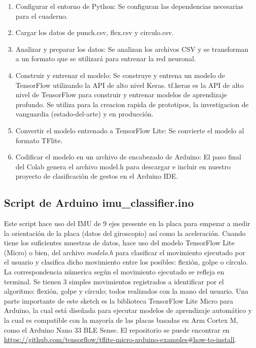     \begin{enumerate}
        \item Configurar el entorno de Python: Se configuran las dependencias necesarias para el cuaderno. \cite{arduino}
        \item Cargar los datos de punch.csv, flex.csv y circulo.csv.
        \item Analizar y preparar los datos: Se analizan los archivos CSV y se transforman a un formato que se utilizará para entrenar la red neuronal. \cite{arduino}
        \item Construir y entrenar el modelo: Se construye y entrena un modelo de TensorFlow utilizando la API de alto nivel Keras. \cite{arduino} tf.keras es la API de alto nivel de TensorFlow para construir y entrenar modelos de aprendizaje profundo. Se utiliza para la creacion rapida de prototipos, la investigacion de vanguardia (estado-del-arte) y en producción. \cite{keras}
        \item Convertir el modelo entrenado a TensorFlow Lite: Se convierte el modelo al formato TFlite. \cite{arduino}
        \item Codificar el modelo en un archivo de encabezado de Arduino: El paso final del Colab genera el archivo model.h para descargar e incluir en nuestro proyecto de clasificación de gestos en el Arduino IDE. \cite{arduino}
    \end{enumerate}

    \subsection{Script de Arduino imu\_classifier.ino }

    Este script hace uso del IMU de 9 ejes presente en la placa para empezar a medir la orientación de la placa (datos del giroscopio) así como la aceleración. Cuando tiene los suficientes muestras de datos, hace uso del modelo TensorFlow Lite (Micro) o bien, del archivo \textit{modelo.h} para clasificar el movimiento ejecutado por el usuario y clasifica dicho movimiento entre los posibles: flexión, golpe o círculo. La correspondencia númerica según el movimiento ejecutado se refleja en terminal.
    Se tienen 3 simples movimientos registrados a identificar por el algoritmo: flexión, golpe y círculo; todos realizados con la mano del usuario. Una parte importante de este sketch es la biblioteca TensorFlow Lite Micro para Arduino, la cual está diseñada para ejecutar modelos de aprendizaje automático y la cual es compatible con la mayoría de las placas basadas en Arm Cortex M, como el Arduino Nano 33 BLE Sense. El repositorio se puede encontrar en \url{https://github.com/tensorflow/tflite-micro-arduino-examples#how-to-install}.

